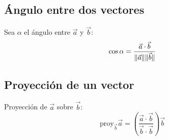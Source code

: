\subsection{Ángulo entre dos vectores} Sea $\alpha$ el ángulo entre $\vec{a}$ y $\vec{b}$:
\begin{equation*}
\cos \alpha = \frac{\vec{a} \cdot \vec{b}}{\lVert\vec{a}\rVert \lVert\vec{b}\rVert}
\end{equation*}

\subsection{Proyección de un vector} Proyección de $\vec{a}$ sobre $\vec{b}$:
\begin{equation*}
\text{proy} _ {\vec{b}} \vec{a} = (\frac{\vec{a} \cdot \vec{b}}{\vec{b} \cdot \vec{b}}) \vec{b}
\end{equation*}